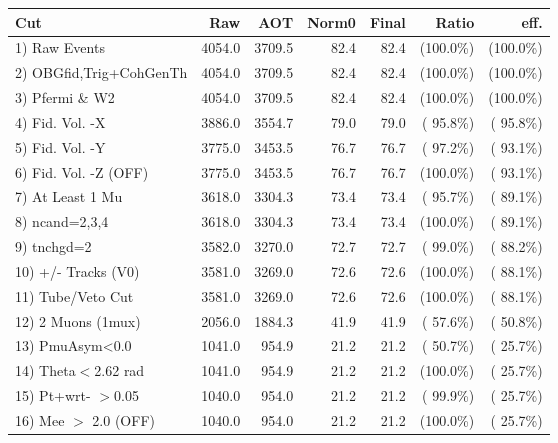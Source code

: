  \begin{table}[h!]\centering
 \begin{tabular}{||l||r|r|r|r|r|r||}
 \hline
 \hline
 Cut & Raw & AOT & Norm0 & Final & Ratio & eff.       \\
 \hline
  1) Raw Events           &       4054.0 &       3709.5 &         82.4 &         82.4 & (100.0\%) & (100.0\%) \\
  2) OBGfid,Trig+CohGenTh &       4054.0 &       3709.5 &         82.4 &         82.4 & (100.0\%) & (100.0\%) \\
  3) Pfermi \& W2         &       4054.0 &       3709.5 &         82.4 &         82.4 & (100.0\%) & (100.0\%) \\
  4) Fid. Vol. -X         &       3886.0 &       3554.7 &         79.0 &         79.0 & ( 95.8\%) & ( 95.8\%) \\
  5) Fid. Vol. -Y         &       3775.0 &       3453.5 &         76.7 &         76.7 & ( 97.2\%) & ( 93.1\%) \\
  6) Fid. Vol. -Z (OFF)   &       3775.0 &       3453.5 &         76.7 &         76.7 & (100.0\%) & ( 93.1\%) \\
  7) At Least 1 Mu        &       3618.0 &       3304.3 &         73.4 &         73.4 & ( 95.7\%) & ( 89.1\%) \\
  8) ncand=2,3,4          &       3618.0 &       3304.3 &         73.4 &         73.4 & (100.0\%) & ( 89.1\%) \\
  9) tnchgd=2             &       3582.0 &       3270.0 &         72.7 &         72.7 & ( 99.0\%) & ( 88.2\%) \\
 10) +/- Tracks (V0)      &       3581.0 &       3269.0 &         72.6 &         72.6 & (100.0\%) & ( 88.1\%) \\
 11) Tube/Veto Cut        &       3581.0 &       3269.0 &         72.6 &         72.6 & (100.0\%) & ( 88.1\%) \\
 12) 2 Muons (1mux)       &       2056.0 &       1884.3 &         41.9 &         41.9 & ( 57.6\%) & ( 50.8\%) \\
 13) PmuAsym<0.0          &       1041.0 &        954.9 &         21.2 &         21.2 & ( 50.7\%) & ( 25.7\%) \\
 14) Theta$<$2.62 rad     &       1041.0 &        954.9 &         21.2 &         21.2 & (100.0\%) & ( 25.7\%) \\
 15) Pt+wrt- $>$0.05      &       1040.0 &        954.0 &         21.2 &         21.2 & ( 99.9\%) & ( 25.7\%) \\
 16) Mee $>$ 2.0  (OFF)   &       1040.0 &        954.0 &         21.2 &         21.2 & (100.0\%) & ( 25.7\%) \\

\end{tabular}
\end{table}
